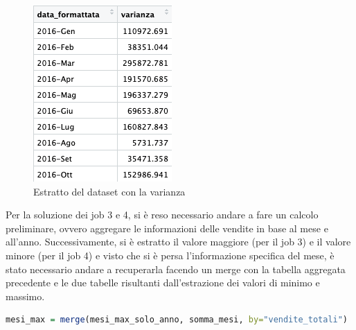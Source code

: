\begin{figure}[ht]
\begin{minipage}{.3\textwidth}
    \includegraphics[width=\linewidth]{img/varianza_r.png}
    \caption{Estratto del dataset con la varianza}
    \label{fig:immagine2}
\end{minipage}
\end{figure}
Per la soluzione dei job 3 e 4, si è reso necessario andare a fare un calcolo preliminare, ovvero aggregare le informazioni delle vendite in base al mese e all'anno. Successivamente, si è estratto il valore maggiore (per il job 3) e il valore minore (per il job 4) e visto che si è persa l'informazione specifica del mese, è stato necessario andare a recuperarla facendo un merge con la tabella aggregata precedente e le due tabelle risultanti dall'estrazione dei valori di minimo e massimo.
\begin{lstlisting}[language=R]
    mesi_max = merge(mesi_max_solo_anno, somma_mesi, by="vendite_totali")
\end{lstlisting}

